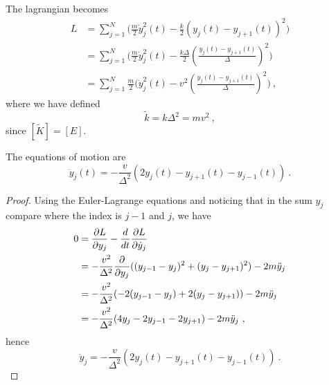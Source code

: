     The lagrangian becomes 
    \begin{equation*}
    \begin{aligned}
        L & = \sum_{j = 1}^{N} \Big ( \frac{m}{2} \dot y_j^2 (t) - \frac{k}{2} (y_j(t) - y_{j+1} (t) )^2 \Big) \\ & = \sum_{j = 1}^{N} \Big ( \frac{m}{2} \dot y_j^2 (t) - \frac{k \Delta}{2} (\frac{y_j(t) - y_{j+1} (t) }{\Delta})^2 \Big) \\ & = \sum_{j = 1}^{N} \frac{m}{2}\Big ( \dot y_j^2 (t) - v^2 (\frac{y_j(t) - y_{j+1} (t) }{\Delta})^2 \Big) ~,
    \end{aligned}
    \end{equation*}
    where we have defined 
    \begin{equation*}
        \tilde k = k \Delta^2 = m v^2 ~,
    \end{equation*}
    since $[\tilde K] = [E]$.

    The equations of motion are 
    \begin{equation*}
        \ddot y_j (t) = - \frac{v}{\Delta^2} ( 2 y_j(t) - y_{j+1} (t) - y_{j-1}(t)) ~.
    \end{equation*}
    \begin{proof}
        Using the Euler-Lagrange equations and noticing that in the sum $y_j$ compare where the index is $j - 1$ and $j$, we have
        \begin{equation*}
        \begin{aligned}
            0 & = \frac{\partial L}{\partial y_j} - \frac{d}{dt} \frac{\partial L}{\partial\dot y_j} \\ & = - \frac{v^2}{\Delta^2} \frac{\partial}{\partial y_j} ((y_{j-1} - y_j)^2 + (y_j - y_{j+1})^2 ) - 2 m \ddot y_j \\ & = - \frac{ v^2}{\Delta^2} ( - 2 (y_{j-1} - y_j) + 2 (y_j - y_{j+1})) - 2 m \ddot y_j \\ & = - \frac{v^2}{\Delta^2} (4 y_j - 2 y_{j-1} - 2 y_{j+1}) - 2 m \ddot y_j ~, 
        \end{aligned}
        \end{equation*}
        hence 
        \begin{equation*}
            \ddot y_j = - \frac{v}{\Delta^2} ( 2 y_j(t) - y_{j+1} (t) - y_{j-1}(t)) ~.
        \end{equation*}
    \end{proof}

